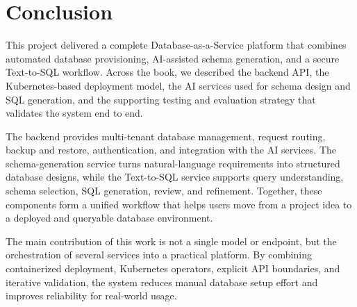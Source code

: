 \section{Conclusion}
\label{sec:7.1_conclusion}

This project delivered a complete Database-as-a-Service platform that combines automated database provisioning, AI-assisted schema generation, and a secure Text-to-SQL workflow. Across the book, we described the backend API, the Kubernetes-based deployment model, the AI services used for schema design and SQL generation, and the supporting testing and evaluation strategy that validates the system end to end.

The backend provides multi-tenant database management, request routing, backup and restore, authentication, and integration with the AI services. The schema-generation service turns natural-language requirements into structured database designs, while the Text-to-SQL service supports query understanding, schema selection, SQL generation, review, and refinement. Together, these components form a unified workflow that helps users move from a project idea to a deployed and queryable database environment.

The main contribution of this work is not a single model or endpoint, but the orchestration of several services into a practical platform. By combining containerized deployment, Kubernetes operators, explicit API boundaries, and iterative validation, the system reduces manual database setup effort and improves reliability for real-world usage.
